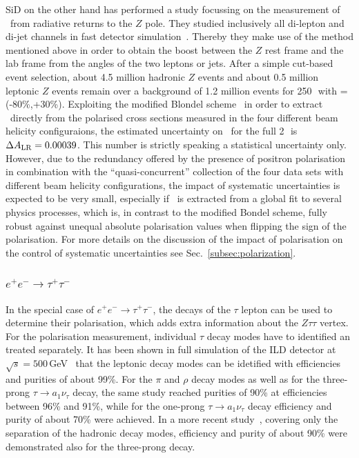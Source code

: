 SiD on the other hand has performed a study focussing on the measurement of \ALR\ from radiative returns to the $Z$ pole. They studied inclusively all di-lepton and di-jet channels in fast detector simulation~\cite{bib:ueno_lcws18}. Thereby they make use of the method mentioned above in order to obtain the boost between the $Z$ rest frame and the lab frame from the angles of the two leptons or jets. After a simple cut-based event selection, about 4.5 million hadronic $Z$ events and about 0.5 million leptonic $Z$ events remain over a background of 1.2 million events for 250\,\ifb\ with \Pmp=(-80\%,+30\%). Exploiting the modified Blondel scheme~\cite{Blondel:1987wr, Monig:2001db} in order to extract \ALR\ directly from the polarised cross sections measured in the four different beam helicity configuraions, the estimated uncertainty on \ALR\ for the full 2\,\iab\ is $\Delta A_{\mathrm{LR}} = 0.00039$. This number is strictly speaking a statistical uncertainty only. However, due to the redundancy offered by the presence of positron polarisation in combination with the ``quasi-concurrent'' collection of the four data sets with different beam helicity configurations, the impact of systematic uncertainties is expected to be very small, especially if \ALR\ is extracted from a global fit to several physics processes, which is, in contrast to the modified Bondel scheme, fully robust against unequal absolute polarisation values when flipping the sign of the polarisation.
For more details on the discussion of the impact of polarisation on the control of systematic uncertainties see Sec.~\ref{subsec:polarization}.

\subsubsection{$e^+e^- \to \tau^+\tau^-$}
In the special case of $e^+e^- \to \tau^+\tau^-$, the decays of the $\tau$ lepton can be used to determine their polarisation, which adds extra information about the $Z \tau \tau$ vertex. For the polarisation measurement, individual $\tau$ decay modes have to identified an treated separately.
It has been shown in full simulation of the ILD detector at $\sqrt{s}=500$\,GeV~\cite{Behnke:2013lya, Suehara:2009nj} that the leptonic decay modes can be idetified with efficiencies and purities of about 99\%. For the $\pi$ and $\rho$  decay modes as well as for the three-prong $\tau \to a_1 \nu_{\tau}$ decay, the same study reached purities of 90\% at efficiencies between 96\% and 91\%, while for the one-prong $\tau \to a_1 \nu_{\tau}$ decay efficiency and purity of about 70\% were achieved. In a more recent study~\cite{Tran:2015nxa}, covering only the separation of the hadronic decay modes, efficiency and purity of about 90\% were demonstrated also for the three-prong decay. 

